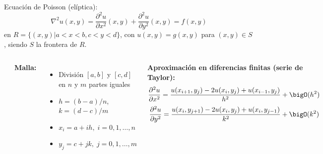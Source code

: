 \documentclass[9pt, aspectratio=169]{beamer}
\begin{document}
\begin{frame}
Ecuación de Poisson (elíptica):
\[ \nabla^2 u(x, y) = \frac{\partial^2 u}{\partial x^2}(x, y) + \frac{\partial^2 u}{\partial y^2}(x, y) = f(x, y) \]
en $R = \{(x, y) | a < x < b, c < y < d \}$, con $u(x, y) = g(x, y)$ para $(x, y) \in S$, siendo $S$ la frontera de $R$.
\begin{columns}
\cx
\begin{center}
    \includegraphics[scale=0.8]{figs/malla-01.pdf}
\end{center}
\cx
\textbf{Malla:}
\begin{itemize}
    \item División $[a, b]$ y $[c, d]$ en $n$ y $m$ partes iguales
    \item $h = (b - a) / n$, $k = (d - c) / m$
    \item $x_i = a + i h, \; i = 0, 1, \ldots, n$
    \item $y_j = c + j k, \; j = 0, 1, \ldots, m$
\end{itemize}

\textbf{Aproximación en diferencias finitas (serie de Taylor):}
\[ \frac{\partial^2 u}{\partial x^2} = \frac{u(x_{i+1}, y_j) - 2 u(x_i, y_j) + u(x_{i-1},y_j)}{h^2} + \bigO(h^2) \]
\[ \frac{\partial^2 u}{\partial y^2} = \frac{u(x_i, y_{j+1}) - 2 u(x_i, y_j) + u(x_i,y_{j-1})}{k^2} + \bigO(k^2) \]
\end{columns}
\end{frame}
\end{document}
